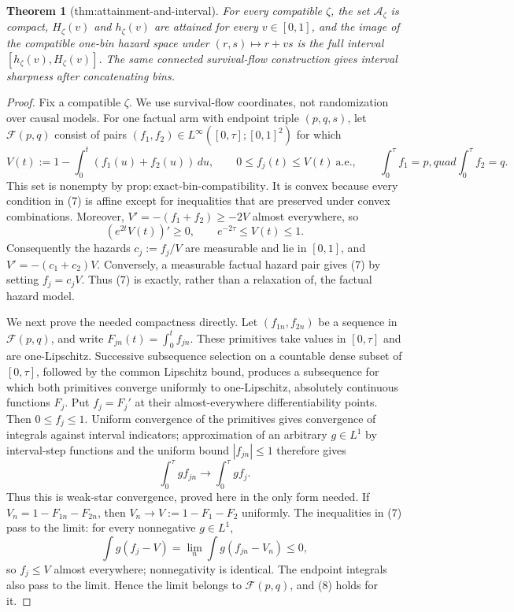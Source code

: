 \documentclass{article}
\newtheorem{theorem}{Theorem}
\begin{document}
\begin{theorem}[thm:attainment-and-interval]\label{thm:attainment-and-interval}
For every compatible \(\zeta\), the set \(\mathcal A_{\zeta}\) is compact, \(H_{\zeta}(v)\) and \(h_{\zeta}(v)\) are attained for every \(v\in[0,1]\), and the image of the compatible one-bin hazard space under \((r,s)\mapsto r+vs\) is the full interval \([h_{\zeta}(v),H_{\zeta}(v)]\). The same connected survival-flow construction gives interval sharpness after concatenating bins.
\end{theorem}
\begin{proof}
Fix a compatible \(\zeta\).  We use survival-flow coordinates, not randomization over causal models.  For one factual arm with endpoint triple \((p,q,s)\), let \(\mathcal F(p,q)\) consist of pairs \((f_1,f_2)\in L^\infty([0,\tau];[0,1]^2)\) for which
\[
 V(t):=1-\int_0^t(f_1(u)+f_2(u))\,du,\quad\quad
 0\le f_j(t)\le V(t)\ \text{a.e.},\quad\quad
 \int_0^\tau f_1=p,quad \int_0^\tau f_2=q.               \tag{7}
\]
This set is nonempty by \(\mathrm{prop{:}exact\text{-}bin\text{-}compatibility}\).  It is convex because every condition in (7) is affine except for inequalities that are preserved under convex combinations.  Moreover, \(V'=-(f_1+f_2)\ge-2V\) almost everywhere, so
\[
 (e^{2t}V(t))'\ge0,\quad\quad e^{-2\tau}\le V(t)\le1.          \tag{8}
\]
Consequently the hazards \(c_j:=f_j/V\) are measurable and lie in \([0,1]\), and \(V'=-(c_1+c_2)V\).  Conversely, a measurable factual hazard pair gives (7) by setting \(f_j=c_jV\).  Thus (7) is exactly, rather than a relaxation of, the factual hazard model.

We next prove the needed compactness directly.  Let \((f_{1n},f_{2n})\) be a sequence in \(\mathcal F(p,q)\), and write \(F_{jn}(t)=\int_0^t f_{jn}\).  These primitives take values in \([0,\tau]\) and are one-Lipschitz.  Successive subsequence selection on a countable dense subset of \([0,\tau]\), followed by the common Lipschitz bound, produces a subsequence for which both primitives converge uniformly to one-Lipschitz, absolutely continuous functions \(F_j\).  Put \(f_j=F_j'\) at their almost-everywhere differentiability points.  Then \(0\le f_j\le1\).  Uniform convergence of the primitives gives convergence of integrals against interval indicators; approximation of an arbitrary \(g\in L^1\) by interval-step functions and the uniform bound \(|f_{jn}|\le1\) therefore gives
\[
 \int_0^\tau g f_{jn}\longrightarrow\int_0^\tau g f_j.   \tag{9}
\]
Thus this is weak-star convergence, proved here in the only form needed.  If \(V_n=1-F_{1n}-F_{2n}\), then \(V_n\to V:=1-F_1-F_2\) uniformly.  The inequalities in (7) pass to the limit: for every nonnegative \(g\in L^1\),
\[
 \int g(f_j-V)=\lim_n\int g(f_{jn}-V_n)\le0,
\]
so \(f_j\le V\) almost everywhere; nonnegativity is identical.  The endpoint integrals also pass to the limit.  Hence the limit belongs to \(\mathcal F(p,q)\), and (8) holds for it.


\end{proof}
\end{document}
